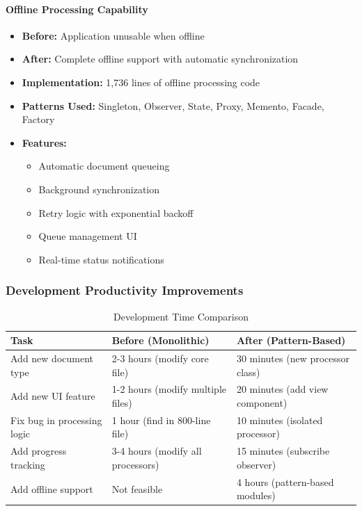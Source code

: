 \documentclass[11pt, a4paper]{article}
\theoremstyle{plain}
\theoremstyle{definition}
\begin{document}
\paragraph{Offline Processing Capability}
\begin{itemize}
    \item \textbf{Before:} Application unusable when offline
    \item \textbf{After:} Complete offline support with automatic synchronization
    \item \textbf{Implementation:} 1,736 lines of offline processing code
    \item \textbf{Patterns Used:} Singleton, Observer, State, Proxy, Memento, Facade, Factory
    \item \textbf{Features:}
    \begin{itemize}
        \item Automatic document queueing
        \item Background synchronization
        \item Retry logic with exponential backoff
        \item Queue management UI
        \item Real-time status notifications
    \end{itemize}
\end{itemize}

\subsubsection{Development Productivity Improvements}

\begin{table}[H]
\centering
\caption{Development Time Comparison}
\label{tab:development-time}
\begin{tabularx}{\textwidth}{lXX}
\toprule
\textbf{Task} & \textbf{Before (Monolithic)} & \textbf{After (Pattern-Based)} \\
\midrule
Add new document type & 2-3 hours (modify core file) & 30 minutes (new processor class) \\
Add new UI feature & 1-2 hours (modify multiple files) & 20 minutes (add view component) \\
Fix bug in processing logic & 1 hour (find in 800-line file) & 10 minutes (isolated processor) \\
Add progress tracking & 3-4 hours (modify all processors) & 15 minutes (subscribe observer) \\
Add offline support & Not feasible & 4 hours (pattern-based modules) \\
\bottomrule
\end{tabularx}
\end{table}
\end{document}
